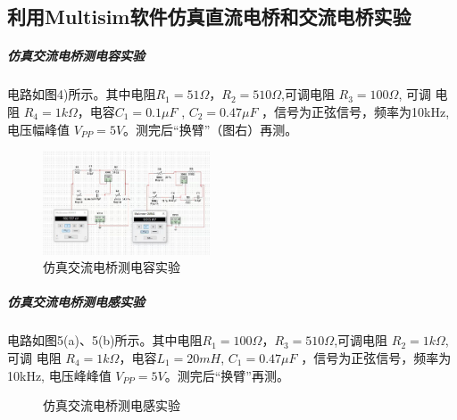 \documentclass[10pt,a4paper,twocolumn,twoside,UTF8]{ctexart}
\begin{document}
    \subsection{利用Multisim软件仿真直流电桥和交流电桥实验 }
    \subparagraph{仿真交流电桥测电容实验} 

	电路如图4)所示。其中电阻$R_1 = 51\Omega$，$R_2 = 510\Omega$,可调电阻 $R_3 = 100\Omega$, 可调
	电阻 $R_4 = 1k\Omega$，电容$C_1 = 0.1\mu F$ , $C_2 = 0. 47\mu F$ ，信号为正弦信号，频率为10kHz,
	电压幅峰值 $V_{PP} = 5V$。测完后“换臂”（图右）再测。
	\begin{figure}[!h]
		\centering
		\includegraphics[width=0.44\textwidth]{img//4.jpg}%
		\caption{仿真交流电桥测电容实验}
		\label{fig:4}
	\end{figure}

	\subparagraph{仿真交流电桥测电感实验} 

	电路如图5(a)、5(b)所示。其中电阻$R_1 = 100\Omega $，$R_3 = 510\Omega$,可调电阻 $R_2 = 1k\Omega$, 可调
电阻 $R_4 = 1k\Omega$，电容$L_1 = 20mH $, $C_1 = 0.47\mu F$ ，信号为正弦信号，频率为10kHz,
电压峰峰值 $V_{PP} = 5V$。测完后“换臂”再测。

\begin{figure}[!h]
	\centering
	\caption{仿真交流电桥测电感实验}
	\label{fig:5}
\end{figure}
\end{document}
